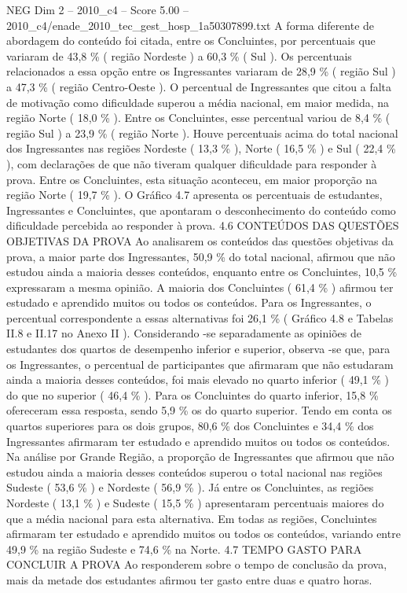 \begin{textsample}{NEG Dim 2 – 2010\_c4 – Score 5.00 – 2010\_c4/enade\_2010\_tec\_gest\_hosp\_1a50307899.txt}
A forma diferente de abordagem do conteúdo foi citada, entre os Concluintes, por percentuais que variaram de 43,8 \% ( região Nordeste ) a 60,3 \% ( Sul ).
Os percentuais relacionados a essa opção entre os Ingressantes variaram de 28,9 \% ( região Sul ) a 47,3 \% ( região Centro-Oeste ).
O percentual de Ingressantes que citou a falta de motivação como dificuldade superou a média nacional, em maior medida, na região Norte ( 18,0 \% ).
Entre os Concluintes, esse percentual variou de 8,4 \% ( região Sul ) a 23,9 \% ( região Norte ).
Houve percentuais acima do total nacional dos Ingressantes nas regiões Nordeste ( 13,3 \% ), Norte ( 16,5 \% ) e Sul ( 22,4 \% ), com declarações de que não tiveram qualquer dificuldade para responder à prova.
Entre os Concluintes, esta situação aconteceu, em maior proporção na região Norte ( 19,7 \% ).
O Gráfico 4.7 apresenta os percentuais de estudantes, Ingressantes e Concluintes, que apontaram o desconhecimento do conteúdo como dificuldade percebida ao responder à prova. 4.6 CONTEÚDOS DAS QUESTÕES OBJETIVAS DA PROVA Ao analisarem os conteúdos das questões objetivas da prova, a maior parte dos Ingressantes, 50,9 \% do total nacional, afirmou que não estudou ainda a maioria desses conteúdos, enquanto entre os Concluintes, 10,5 \% expressaram a mesma opinião.
A maioria dos Concluintes ( 61,4 \% ) afirmou ter estudado e aprendido muitos ou todos os conteúdos.
Para os Ingressantes, o percentual correspondente a essas alternativas foi 26,1 \% ( Gráfico 4.8 e Tabelas II.8 e II.17 no Anexo II ).
Considerando -se separadamente as opiniões de estudantes dos quartos de desempenho inferior e superior, observa -se que, para os Ingressantes, o percentual de participantes que afirmaram que não estudaram ainda a maioria desses conteúdos, foi mais elevado no quarto inferior ( 49,1 \% ) do que no superior ( 46,4 \% ).
Para os Concluintes do quarto inferior, 15,8 \% ofereceram essa resposta, sendo 5,9 \% os do quarto superior.
Tendo em conta os quartos superiores para os dois grupos, 80,6 \% dos Concluintes e 34,4 \% dos Ingressantes afirmaram ter estudado e aprendido muitos ou todos os conteúdos.
Na análise por Grande Região, a proporção de Ingressantes que afirmou que não estudou ainda a maioria desses conteúdos superou o total nacional nas regiões Sudeste ( 53,6 \% ) e Nordeste ( 56,9 \% ).
Já entre os Concluintes, as regiões Nordeste ( 13,1 \% ) e Sudeste ( 15,5 \% ) apresentaram percentuais maiores do que a média nacional para esta alternativa.
Em todas as regiões, Concluintes afirmaram ter estudado e aprendido muitos ou todos os conteúdos, variando entre 49,9 \% na região Sudeste e 74,6 \% na Norte. 4.7 TEMPO GASTO PARA CONCLUIR A PROVA Ao responderem sobre o tempo de conclusão da prova, mais da metade dos estudantes afirmou ter gasto entre duas e quatro horas.

\end{textsample}
